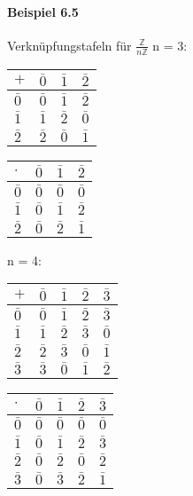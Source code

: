 \documentclass[a4paper]{scrartcl}
\theoremstyle{definition}
\theoremstyle{plain}
\theoremstyle{plain}
\theoremstyle{remark}
\theoremstyle{remark}
\theoremstyle{remark}
\begin{document}
\paragraph{Beispiel 6.5}
\label{sec-3-2-4-2}
Verknüpfungstafeln für $\frac{\mathbb{Z}}{n\mathbb{Z}}$
n = 3:
\begin{center}
\begin{tabular}{llll}
$+$ & $\bar 0$ & $\bar 1$ & $\bar 2$\\
\hline
$\bar 0$ & $\bar 0$ & $\bar 1$ & $\bar 2$\\
$\bar 1$ & $\bar 1$ & $\bar 2$ & $\bar 0$\\
$\bar 2$ & $\bar 2$ & $\bar 0$ & $\bar 1$\\
\end{tabular}
\end{center}

\begin{center}
\begin{tabular}{llll}
$\cdot$ & $\bar 0$ & $\bar 1$ & $\bar 2$\\
\hline
$\bar 0$ & $\bar 0$ & $\bar 0$ & $\bar 0$\\
$\bar 1$ & $\bar 0$ & $\bar 1$ & $\bar 2$\\
$\bar 2$ & $\bar 0$ & $\bar 2$ & $\bar 1$\\
\end{tabular}
\end{center}
n = 4:
\begin{center}
\begin{tabular}{lllll}
$+$ & $\bar 0$ & $\bar 1$ & $\bar 2$ & $\bar 3$\\
\hline
$\bar 0$ & $\bar 0$ & $\bar 1$ & $\bar 2$ & $\bar 3$\\
$\bar 1$ & $\bar 1$ & $\bar 2$ & $\bar 3$ & $\bar 0$\\
$\bar 2$ & $\bar 2$ & $\bar 3$ & $\bar 0$ & $\bar 1$\\
$\bar 3$ & $\bar 3$ & $\bar 0$ & $\bar 1$ & $\bar 2$\\
\end{tabular}
\end{center}

\begin{center}
\begin{tabular}{lllll}
$\cdot$ & $\bar 0$ & $\bar 1$ & $\bar 2$ & $\bar 3$\\
\hline
$\bar 0$ & $\bar 0$ & $\bar 0$ & $\bar 0$ & $\bar 0$\\
$\bar 1$ & $\bar 0$ & $\bar 1$ & $\bar 2$ & $\bar 3$\\
$\bar 2$ & $\bar 0$ & $\bar 2$ & $\bar 0$ & $\bar 2$\\
$\bar 3$ & $\bar 0$ & $\bar 3$ & $\bar 2$ & $\bar 1$\\
\end{tabular}
\end{center}
\end{document}
